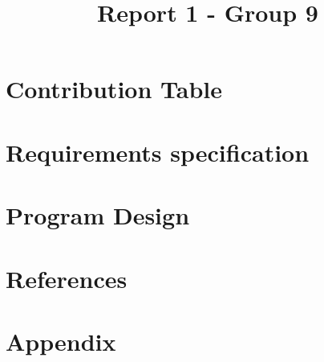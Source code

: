 \documentclass[12pt,oneside,a4paper,english]{article}
\title{Report 1 - Group 9} %
\begin{document}


\newpage
\section*{Contribution Table}
 

\newpage
\doublespacing
\renewcommand{\baselinestretch}{1}\normalsize
\setcounter{tocdepth}{4}
\setcounter{secnumdepth}{2}
\tableofcontents
\renewcommand{\baselinestretch}{1}\normalsize
\thispagestyle{fancy} %

\newpage
{} 

\section{Requirements specification} \label{ch1}
 

\section{Program Design} \label{ch2}
 

\label{EndOfText}



\newpage
\section{References}
 


\newpage
\section{Appendix} \label{ch6}



\label{endOfDoc}
\end{document}
